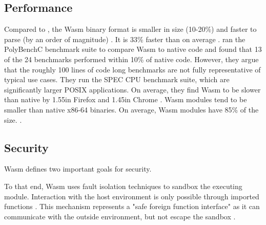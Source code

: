 \subsection{Performance}

Compared to , the Wasm binary format is smaller in size (10-20\%) and faster to parse (by an order of magnitude)
\cite{Clark2019}. It is 33\% faster than  on average \cite{Haas2017}.
\citeauthor{NotSoFast} ran the PolyBenchC benchmark suite to compare Wasm to native code and found that 13 of the 24 benchmarks performed within 10\% of native code. However, they argue that the roughly 100 lines of code long benchmarks are not fully representative of typical use cases. They run the SPEC CPU benchmark suite, which are significantly larger POSIX applications. On average, they find Wasm to be slower than native by 1.55\times in Firefox and 1.45\times in Chrome \cite{NotSoFast}.
Wasm modules tend to be smaller than native x86-64 binaries. On average, Wasm modules have 85\% of the size.
\cite{Haas2017}.




\subsection{Security}


Wasm defines two important goals for security.

\begin{quote}
\end{quote}

To that end, Wasm uses fault isolation techniques to sandbox the executing module. Interaction with the host environment is only possible through imported functions \cite{W3C2020}. This mechanism represents a "safe foreign function interface" as it can communicate with the outside environment, but not escape the sandbox \cite{Haas2017}.

